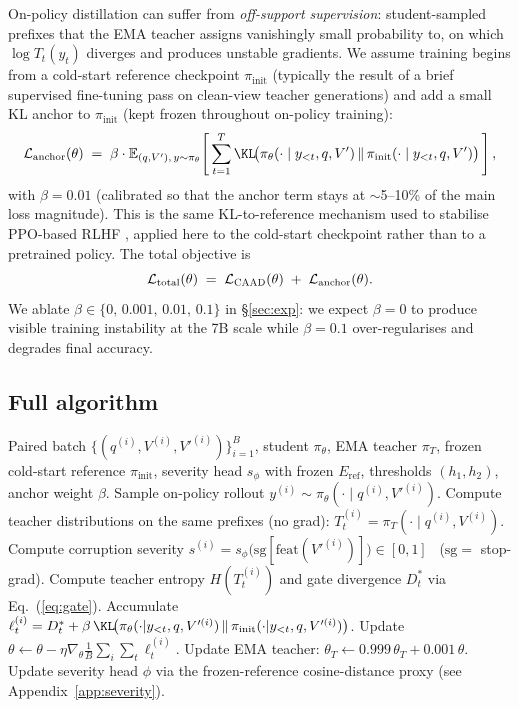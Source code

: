 \documentclass{article}
\newcommand{\teacher}{\pi_T}
\newcommand{\student}{\pi_\theta}
\newcommand{\caad}{\textsc{CAAD}}
\begin{document}
On-policy distillation can suffer from \emph{off-support supervision}: student-sampled prefixes that the EMA teacher assigns vanishingly small probability to, on which $\log T_t(y_t)$ diverges and produces unstable gradients. We assume training begins from a cold-start reference checkpoint $\pi_{\text{init}}$ (typically the result of a brief supervised fine-tuning pass on clean-view teacher generations) and add a small KL anchor to $\pi_{\text{init}}$ (kept frozen throughout on-policy training):
\begin{equation}
\label{eq:anchor}
\mathcal{L}_{\text{anchor}}(\theta) \;=\; \beta \cdot \mathbb{E}_{(q,V'),\, y \sim \student}\!\left[\, \sum_{t=1}^T \KL\!\big(\student(\cdot \mid y_{<t}, q, V') \,\|\, \pi_{\text{init}}(\cdot \mid y_{<t}, q, V')\big) \,\right],
\end{equation}
with $\beta = 0.01$ (calibrated so that the anchor term stays at $\sim$5--10\% of the main loss magnitude). This is the same KL-to-reference mechanism used to stabilise PPO-based RLHF \citep{schulman2017ppo}, applied here to the cold-start checkpoint rather than to a pretrained policy. The total objective is
\[
\mathcal{L}_{\text{total}}(\theta) \;=\; \mathcal{L}_\caad(\theta) \;+\; \mathcal{L}_{\text{anchor}}(\theta).
\]
We ablate $\beta \in \{0,\, 0.001,\, 0.01,\, 0.1\}$ in \S\ref{sec:exp}: we expect $\beta=0$ to produce visible training instability at the 7B scale while $\beta=0.1$ over-regularises and degrades final accuracy.

\subsection{Full algorithm}

\begin{algorithm}[t]
\caption{\caad{} training (one update)}
\label{alg:caad}
\begin{algorithmic}[1]
\Require Paired batch $\{(q^{(i)}, V^{(i)}, V'^{(i)})\}_{i=1}^B$, student $\student$, EMA teacher $\teacher$, frozen cold-start reference $\pi_{\text{init}}$, severity head $s_\phi$ with frozen $E_{\text{ref}}$, thresholds $(h_1, h_2)$, anchor weight $\beta$.
  \State Sample on-policy rollout $y^{(i)} \sim \student(\cdot \mid q^{(i)}, V'^{(i)})$.
  \State Compute teacher distributions on the same prefixes (no grad):
         $T_t^{(i)} = \teacher(\cdot \mid q^{(i)}, V^{(i)})$.
  \State Compute corruption severity $s^{(i)} = s_\phi\!\big(\mathrm{sg}[\text{feat}(V'^{(i)})]\big) \in [0,1]$ \ ($\mathrm{sg}=$ stop-grad).
    \State Compute teacher entropy $H(T_t^{(i)})$ and gate divergence $D^*_t$ via Eq.~(\ref{eq:gate}).
    \State Accumulate $\ell_t^{(i)} = D^*_t + \beta\,\KL\!\big(\student(\cdot|y_{<t},q,V'^{(i)}) \,\|\, \pi_{\text{init}}(\cdot|y_{<t},q,V'^{(i)})\big)$.
  \EndFor
\EndFor
\State Update $\theta \leftarrow \theta - \eta \nabla_\theta \frac{1}{B} \sum_i \sum_t \ell_t^{(i)}$.
\State Update EMA teacher: $\theta_T \leftarrow 0.999\, \theta_T + 0.001\, \theta$.
\State Update severity head $\phi$ via the frozen-reference cosine-distance proxy (see Appendix~\ref{app:severity}).
\end{algorithmic}
\end{algorithm}
\end{document}
